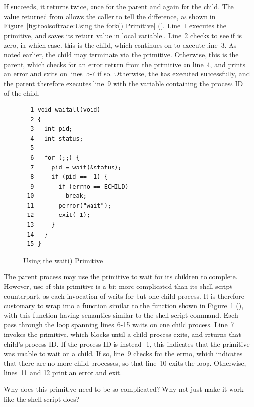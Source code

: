 If  succeeds, it returns twice, once for the parent
and again for the child.
The value returned from  allows the caller to tell
the difference, as shown in
Figure~\ref{fig:toolsoftrade:Using the fork() Primitive}
().
Line~1 executes the  primitive, and saves its return value
in local variable .
Line~2 checks to see if  is zero, in which case, this is the
child, which continues on to execute line~3.
As noted earlier, the child may terminate via the  primitive.
Otherwise, this is the parent, which checks for an error return from
the  primitive on line~4, and prints an error and exits
on lines~5-7 if so.
Otherwise, the  has executed successfully, and the parent
therefore executes line~9 with the variable  containing the
process ID of the child.

\begin{figure}[tbp]
{ \scriptsize
\begin{verbatim}
  1 void waitall(void)
  2 {
  3   int pid;
  4   int status;
  5 
  6   for (;;) {
  7     pid = wait(&status);
  8     if (pid == -1) {
  9       if (errno == ECHILD)
 10         break;
 11       perror("wait");
 12       exit(-1);
 13     }
 14   }
 15 }
\end{verbatim}
}
\caption{Using the wait() Primitive}
\label{fig:toolsoftrade:Using the wait() Primitive}
\end{figure}

The parent process may use the  primitive to wait for its children
to complete.
However, use of this primitive is a bit more complicated than its shell-script
counterpart, as each invocation of  waits for but one child
process.
It is therefore customary to wrap  into a function similar
to the  function shown in
Figure~\ref{fig:toolsoftrade:Using the wait() Primitive}
(),
with this  function having semantics similar to the
shell-script  command.
Each pass through the loop spanning lines~6-15 waits on one child process.
Line~7 invokes the  primitive, which blocks until a child process
exits, and returns that child's process ID.
If the process ID is instead -1, this indicates that the 
primitive was unable to wait on a child.
If so, line~9 checks for the  errno, which indicates that there
are no more child processes, so that line~10 exits the loop.
Otherwise, lines~11 and 12 print an error and exit.

\QuickQuiz{}
	Why does this  primitive need to be so complicated?
	Why not just make it work like the shell-script  does?
 \QuickQuizEnd

